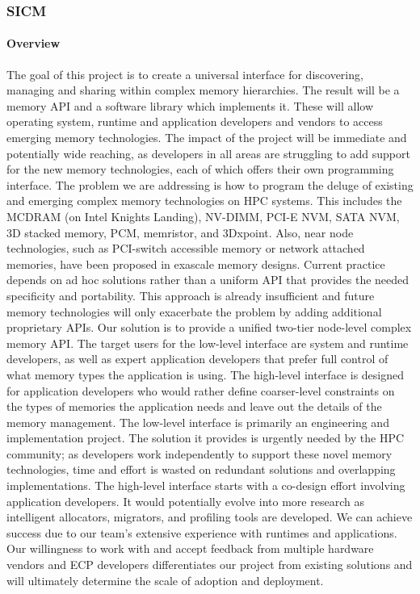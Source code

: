 \subsubsection{SICM} 
\paragraph{Overview} The goal of this project is to create a universal interface for discovering, managing and sharing within complex memory hierarchies. The result will be a memory API and a software library which implements it. These will allow operating system, runtime and application developers and vendors to access emerging memory technologies. The impact of the project will be immediate and potentially wide reaching, as developers in all areas are struggling to add support for the new memory technologies, each of which offers their own programming interface. The problem we are addressing is how to program the deluge of existing and emerging complex memory technologies on HPC systems. This includes the MCDRAM (on Intel Knights Landing), NV-DIMM, PCI-E NVM, SATA NVM, 3D stacked memory, PCM, memristor, and 3Dxpoint. Also, near node technologies, such as PCI-switch accessible memory or network attached memories, have been proposed in exascale memory designs. Current practice depends on ad hoc solutions rather than a uniform API that provides the needed specificity and portability. This approach is already insufficient and future memory technologies will only exacerbate the problem by adding additional proprietary APIs. Our solution is to provide a unified two-tier node-level complex memory API. The target users for the low-level interface are system and runtime developers, as well as expert application developers that prefer full control of what memory types the application is using. The high-level interface is designed for application developers who would rather define coarser-level constraints on the types of memories the application needs and leave out the details of the memory management. The low-level interface is primarily an engineering and implementation project. The solution it provides is urgently needed by the HPC community; as developers work independently to support these novel memory technologies, time and effort is wasted on redundant solutions and overlapping implementations. The high-level interface starts with a co-design effort involving application developers. It would potentially evolve into more research as intelligent allocators, migrators, and profiling tools are developed. We can achieve success due to our team’s extensive experience with runtimes and applications. Our willingness to work with and accept feedback from multiple hardware vendors and ECP developers differentiates our project from existing solutions and will ultimately determine the scale of adoption and deployment. 
